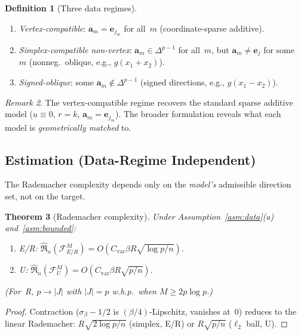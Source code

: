 \documentclass[11pt,a4paper]{article}
\newtheorem{theorem}{Theorem}[section]
\theoremstyle{definition}
\newtheorem{definition}[theorem]{Definition}
\theoremstyle{remark}
\newtheorem{remark}[theorem]{Remark}
\newcommand{\va}{\mathbf{a}}
\newcommand{\ve}{\mathbf{e}}
\newcommand{\simplex}{\Delta^{p-1}}
\newcommand{\Rad}{\widehat{\mathfrak{R}}_n}
\begin{document}
\begin{definition}[Three data regimes]
  \label{def:regimes}
  \leavevmode
  \begin{enumerate}[label=(\roman*),nosep]
    \item \emph{Vertex-compatible}:
    $\va_m = \ve_{j_m}$ for all~$m$
    (coordinate-sparse additive).
    \item \emph{Simplex-compatible non-vertex}:
    $\va_m \in \simplex$ for all~$m$,
    but $\va_m \neq \ve_j$ for some~$m$
    (nonneg.\ oblique, e.g.,
    $g(x_1{+}x_2)$).
    \item \emph{Signed-oblique}:
    some $\va_m \notin \simplex$
    (signed directions, e.g.,
    $g(x_1{-}x_2)$).
  \end{enumerate}
\end{definition}

\begin{remark}
  The vertex-compatible regime recovers
  the standard sparse additive model
  ($u \equiv 0$, $r = k$, $\va_m = \ve_{j_m}$).
  The broader formulation reveals
  what each model is \emph{geometrically
  matched} to.
\end{remark}


\subsection{Estimation (Data-Regime Independent)}

The Rademacher complexity depends only on the
\emph{model's} admissible direction set, not
on the target.

\begin{theorem}[Rademacher complexity]
  \label{thm:rad}
  Under Assumption~\ref{asm:data}(a)
  and~\ref{asm:bounded}:
  \begin{enumerate}[label=(\alph*),leftmargin=*]
    \item E/R:\;
    $\Rad(\mathcal{F}_{E/R}^M)
    = O(C_{\mathrm{var}}\beta R
    \sqrt{\log p/n})$.
    \item U:\;
    $\Rad(\mathcal{F}_U^M)
    = O(C_{\mathrm{var}}\beta R
    \sqrt{p/n})$.
  \end{enumerate}
  (For~R, $p \to |J|$ with $|J| = p$
  w.h.p.\ when $M \ge 2p\log p$.)
\end{theorem}

\begin{proof}
  Contraction ($\sigma_\beta{-}1/2$ is
  $(\beta/4)$-Lipschitz, vanishes at~$0$)
  reduces to the linear Rademacher:
  $R\sqrt{2\log p/n}$ (simplex, E/R)
  or $R\sqrt{p/n}$ ($\ell_2$ ball, U).
\end{proof}
\end{document}
